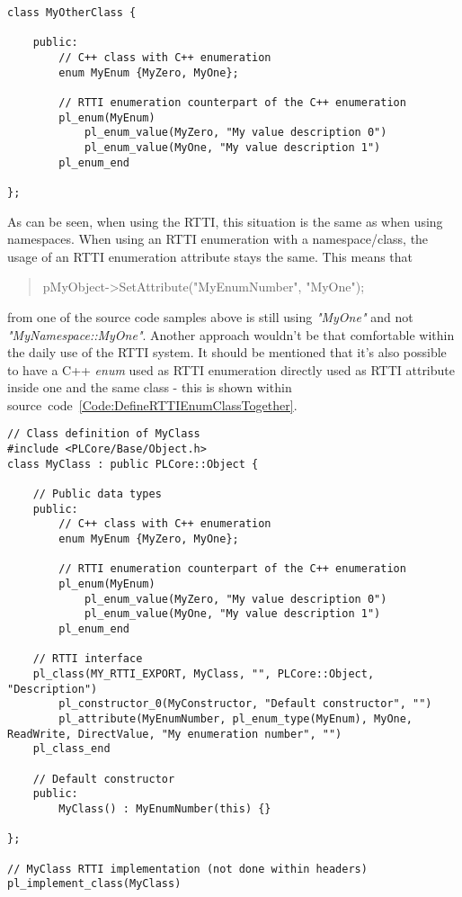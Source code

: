 \begin{lstlisting}[label=Code:DefineRTTIEnumClass,caption={Defining a new RTTI enumeration using a C++ enum inside a class}]
class MyOtherClass {

	public:
		// C++ class with C++ enumeration
		enum MyEnum {MyZero, MyOne};

		// RTTI enumeration counterpart of the C++ enumeration
		pl_enum(MyEnum)
			pl_enum_value(MyZero, "My value description 0")
			pl_enum_value(MyOne, "My value description 1")
		pl_enum_end

};
\end{lstlisting}
As can be seen, when using the RTTI, this situation is the same as when using namespaces. When using an RTTI enumeration with a namespace/class, the usage of an RTTI enumeration attribute stays the same. This means that \begin{quote}pMyObject->SetAttribute("MyEnumNumber", "MyOne");\end{quote} from one of the source code samples above is still using \emph{"MyOne"} and not \emph{"MyNamespace::MyOne"}. Another approach wouldn't be that comfortable within the daily use of the RTTI system. It should be mentioned that it's also possible to have a C++ \emph{enum} used as RTTI enumeration directly used as RTTI attribute inside one and the same class - this is shown within source~code~\ref{Code:DefineRTTIEnumClassTogether}.
\begin{lstlisting}[label=Code:DefineRTTIEnumClassTogether,caption={Defining and using a new RTTI enumeration inside one and the same class}]
// Class definition of MyClass
#include <PLCore/Base/Object.h>
class MyClass : public PLCore::Object {

	// Public data types
	public:
		// C++ class with C++ enumeration
		enum MyEnum {MyZero, MyOne};

		// RTTI enumeration counterpart of the C++ enumeration
		pl_enum(MyEnum)
			pl_enum_value(MyZero, "My value description 0")
			pl_enum_value(MyOne, "My value description 1")
		pl_enum_end

	// RTTI interface
	pl_class(MY_RTTI_EXPORT, MyClass, "", PLCore::Object, "Description")
		pl_constructor_0(MyConstructor, "Default constructor", "")
		pl_attribute(MyEnumNumber, pl_enum_type(MyEnum), MyOne, ReadWrite, DirectValue, "My enumeration number", "")
	pl_class_end

	// Default constructor
	public:
		MyClass() : MyEnumNumber(this) {}

};

// MyClass RTTI implementation (not done within headers)
pl_implement_class(MyClass)
\end{lstlisting}


